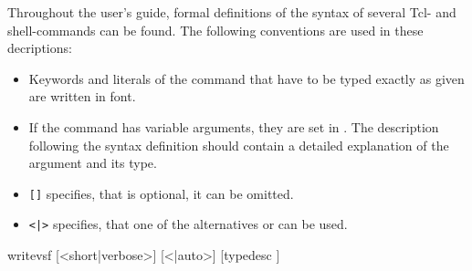 Throughout the user's guide, formal definitions of the syntax of
several Tcl- and shell-commands can be found. The following
conventions are used in these decriptions:
\begin{itemize}
\item Keywords and literals of the command that have to be typed
  exactly as given are written in  font.
\item If the command has variable arguments, they are set in
  . The description following the syntax definition
  should contain a detailed explanation of the argument and its
  type.
\item \texttt{[]} specifies, that  is
  optional, \ie{} it can be omitted.
\item \texttt{<|>} specifies, that one of the
  alternatives  or  can be used.
\end{itemize}

\begin{code}
writevsf  [<short|verbose>] [<|auto>] [typedesc ]
\end{code}



